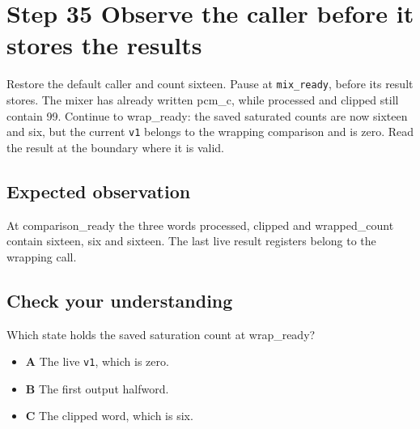 \section{Step 35 Observe the caller before it stores the results}\label{pcm-s35}

Restore the default caller and count sixteen. Pause at \texttt{mix\_ready}, before its result stores. The mixer has already written pcm\_c, while processed and clipped still contain 99. Continue to wrap\_ready: the saved saturated counts are now sixteen and six, but the current \texttt{v1} belongs to the wrapping comparison and is zero. Read the result at the boundary where it is valid.

\subsection{Expected observation}
At comparison\_ready the three words processed, clipped and wrapped\_count contain sixteen, six and sixteen. The last live result registers belong to the wrapping call.

\subsection{Check your understanding}
Which state holds the saved saturation count at wrap\_ready?

\begin{itemize}
  \item \textbf{A} The live \texttt{v1}, which is zero.
  \item \textbf{B} The first output halfword.
  \item \textbf{C} The clipped word, which is six.
\end{itemize}
